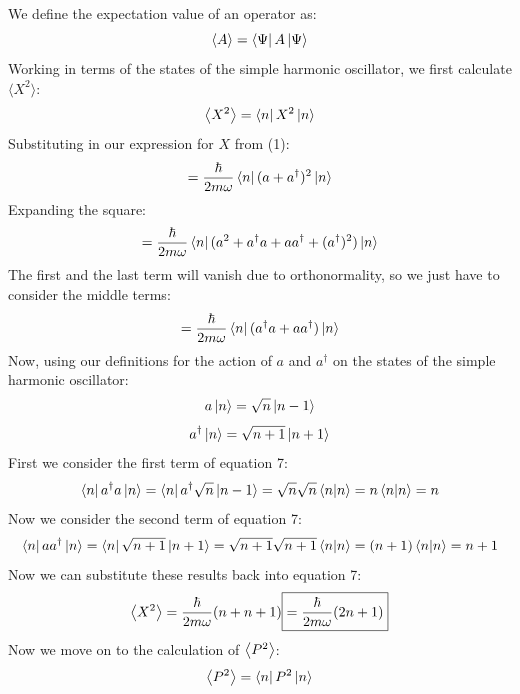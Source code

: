 \documentclass[12pt]{article}
\begin{document}
We define the expectation value of an operator as:
\begin{equation}
    \ev{A} = \bra{\Psi}A\ket{\Psi}
\end{equation}
Working in terms of the states of the simple harmonic oscillator, we first calculate \(\langle X^2\rangle\):
\begin{equation}
    \ev{X^2} = \bra{n}X^2\ket{n}
\end{equation}
Substituting in our expression for \(X\) from (1):
\begin{equation}
    = \frac{\hbar}{2m\omega}\bra{n}(a + a^{\dagger})^2\ket{n}
\end{equation}
Expanding the square:
\begin{equation}
    = \frac{\hbar}{2m\omega}\bra{n}(a^2 + a^{\dagger}a + aa^{\dagger} + (a^{\dagger})^2)\ket{n}
\end{equation}
The first and the last term will vanish due to orthonormality, so we just have to consider the middle terms:
\begin{equation}
    = \frac{\hbar}{2m\omega}\bra{n}(a^{\dagger}a + aa^{\dagger})\ket{n}
\end{equation}
Now, using our definitions for the action of \(a\) and \(a^{\dagger}\) on the states of the simple harmonic oscillator:
\begin{equation}
    a\ket{n} = \sqrt{n}\ket{n-1}
\end{equation}
\begin{equation}
    a^{\dagger}\ket{n} = \sqrt{n+1}\ket{n+1}
\end{equation}
First we consider the first term of equation 7:
\begin{equation}
\bra{n}a^{\dagger}a\ket{n} = \bra{n}a^{\dagger}\sqrt{n}\ket{n-1} = \sqrt{n}\sqrt{n}\bra{n}\ket{n}=n\bra{n}\ket{n}=n
\end{equation}
Now we consider the second term of equation 7:
\begin{equation}
\bra{n}aa^{\dagger}\ket{n} = \bra{n}\sqrt{n+1}\ket{n+1} = \sqrt{n+1}\sqrt{n+1}\bra{n}\ket{n}=(n+1)\bra{n}\ket{n}=n+1
\end{equation}
Now we can substitute these results back into equation 7:
\begin{equation}
   \ev{X^2} = \frac{\hbar}{2m\omega}(n + n + 1)\boxed{= \frac{\hbar}{2m\omega}(2n + 1)}
\end{equation}
Now we move on to the calculation of \(\ev{P^2}\):
\begin{equation}
    \ev{P^2} = \bra{n}P^2\ket{n}
\end{equation}
\end{document}
